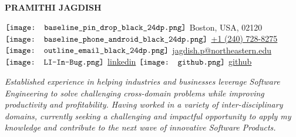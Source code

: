 \documentclass[letterpaper,11pt]{article}
\begin{document}
\begin{center}
\vspace{-15pt}
 \textbf{\huge \scshape PRAMITHI JAGDISH} \\ \vspace{4pt}

    $\vcenter{\hbox{{\texttt{[image: baseline\_pin\_drop\_black\_24dp.png]}}}}$
    Boston, USA, 02120 \hspace{2pt} 
    $\vcenter{\hbox{{\texttt{[image: baseline\_phone\_android\_black\_24dp.png]}}}}$
    \href{+1 (240) 728-8275}{+1 (240) 728-8275} \hspace{2pt} 
    $\vcenter{\hbox{{\texttt{[image: outline\_email\_black\_24dp.png]}}}}$
    \href{mailto:jagdish.p@northeastern.edu}{jagdish.p@northeastern.edu}  \hspace{2pt} 
    $\vcenter{\hbox{{\texttt{[image: LI-In-Bug.png]}}}}$
    \href{https://www.linkedin.com/in/pramithi-jagdish/}{linkedin} \hspace{2pt}
    $\vcenter{\hbox{{\texttt{[image: github.png]}}}}$
    \href{https://github.com/pramitij}{github} 
\vspace{-7pt}
\end{center}

\vspace{-7pt}
\hrulefill
\vspace{-5pt}
\begin{center}
\textit{Established experience in helping industries and businesses leverage Software Engineering to solve challenging cross-domain problems while improving productivity and profitability. Having worked in a variety of inter-disciplinary domains, currently seeking a challenging and impactful opportunity to apply my knowledge and contribute to the next wave of innovative Software Products.}
\end{center}
\vspace{-15pt}
\end{document}
